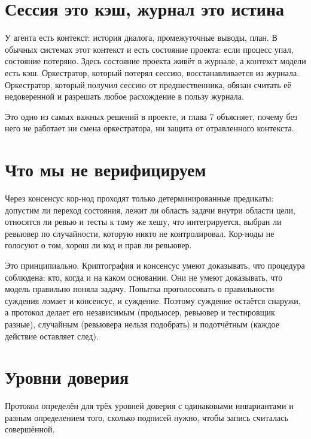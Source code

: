 \section{Сессия это кэш, журнал это истина}

У агента есть контекст: история диалога, промежуточные выводы, план. В обычных системах этот контекст и есть состояние проекта: если процесс упал, состояние потеряно. Здесь состояние проекта живёт в журнале, а контекст модели есть кэш. Оркестратор, который потерял сессию, восстанавливается из журнала. Оркестратор, который получил сессию от предшественника, обязан считать её недоверенной и разрешать любое расхождение в пользу журнала.

Это одно из самых важных решений в проекте, и глава 7 объясняет, почему без него не работает ни смена оркестратора, ни защита от отравленного контекста.

\section{Что мы не верифицируем}

Через консенсус кор-нод проходят только детерминированные предикаты: допустим ли переход состояния, лежит ли область задачи внутри области цели, относятся ли ревью и тесты к тому же хешу, что интегрируется, выбран ли ревьювер по случайности, которую никто не контролировал. Кор-ноды не голосуют о том, хорош ли код и прав ли ревьювер.

Это принципиально. Криптография и консенсус умеют доказывать, что процедура соблюдена: кто, когда и на каком основании. Они не умеют доказывать, что модель правильно поняла задачу. Попытка проголосовать о правильности суждения ломает и консенсус, и суждение. Поэтому суждение остаётся снаружи, а протокол делает его независимым (продьюсер, ревьювер и тестировщик разные), случайным (ревьювера нельзя подобрать) и подотчётным (каждое действие оставляет след).

\section{Уровни доверия}

Протокол определён для трёх уровней доверия с одинаковыми инвариантами и разным определением того, сколько подписей нужно, чтобы запись считалась совершённой.

